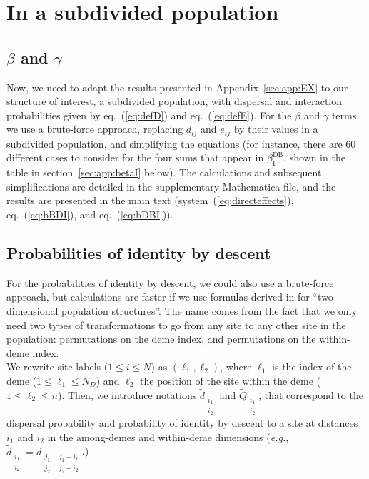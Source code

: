 \documentclass[11pt, letterpaper]{article}
\renewcommand{\eqref}[1]{\textup{{\normalfont eq.~(\ref{#1}}\normalfont)}}
\newcommand{\sysref}[1]{system~(\ref{#1})}
\newcommand{\eg}{\textit{e.g.}}
\newcommand{\appname}[0]{Appendix}
\newcommand{\indirect}{\mathrm{I}}
\newcommand{\DB}{\textrm{DB}}
\newcommand{\ndemes}{N_D}
\begin{document}
\clearpage
\section{\label{sec:app:subdiv}In a subdivided population}

\subsection{\label{sec:app:bcsubdiv}$\beta$ and $\gamma$}
Now, we need to adapt the results presented in \appname~\ref{sec:app:EX} to our structure of interest, a subdivided population, with dispersal and interaction probabilities given by \eqref{eq:defD} and \eqref{eq:defE}. For the $\beta$ and $\gamma$ terms, we use a brute-force approach, replacing $d_{ij}$ and $e_{ij}$ by their values in a subdivided population, and simplifying the equations (for instance, there are $60$ different cases to consider for the four sums that appear in $\beta_{\indirect}^{\DB}$, shown in the table in section~\ref{sec:app:betaI} below). The calculations and subsequent simplifications are detailed in the supplementary Mathematica file, and the results are presented in the main text (\sysref{eq:directeffects}, \eqref{eq:bBDI}, and \eqref{eq:bDBI}). 

\subsection{\label{sec:app:Qsubdiv}Probabilities of identity by descent}
For the probabilities of identity by descent, we could also use a brute-force approach, but calculations are faster if we use formulas derived in \citet{Debarre2017} for ``two-dimensional population structures''. The name comes from the fact that we only need two types of transformations to go from any site to any other site in the population: permutations on the deme index, and permutations on the within-deme index.  \\
%
We rewrite site labels ($1\leq i \leq N$) as $(\ell_1, \ell_2)$, where $\ell_1$ is the index of the deme ($1\leq \ell_1 \leq \ndemes$) and $\ell_2$ the position of the site within the deme ($1\leq \ell_2 \leq n$). Then, we introduce notations $\tilde{d}_{\substack{i_1\\i_2}}$ and $\tilde{Q}_{\substack{i_1\\i_2}}$, that correspond to the dispersal probability and probability of identity by descent to a site at distances $i_1$ and $i_2$ in the among-demes and within-deme dimensions (\eg, $\tilde{d}_{\substack{i_1\\i_2}} = d_{\substack{j_1\\j_2}, \substack{j_1+i_1\\j_2+i_2}}$.) 
\end{document}
